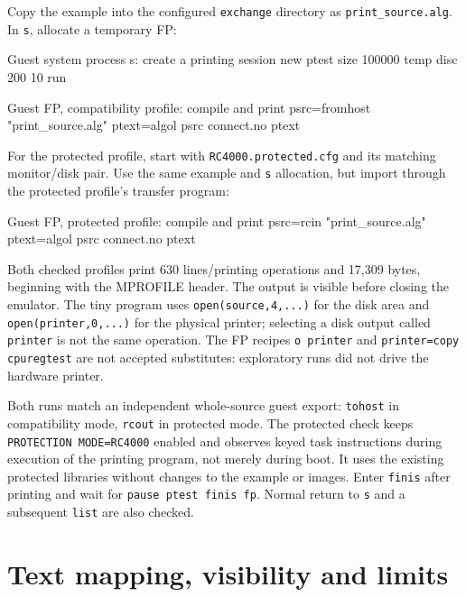 Copy the example into the configured \texttt{exchange} directory as
\texttt{print\_source.alg}. In \texttt{s}, allocate a temporary FP:

\begin{commandexample}{Guest system process s: create a printing session}
new ptest size 100000 temp disc 200 10 run
\end{commandexample}

\begin{commandexample}{Guest FP, compatibility profile: compile and print}
psrc=fromhost "print_source.alg"
ptext=algol psrc connect.no
ptext
\end{commandexample}

For the protected profile, start with \texttt{RC4000.protected.cfg} and its
matching monitor/disk pair. Use the same example and \texttt{s} allocation,
but import through the protected profile's transfer program:

\begin{commandexample}{Guest FP, protected profile: compile and print}
psrc=rcin "print_source.alg"
ptext=algol psrc connect.no
ptext
\end{commandexample}

Both checked profiles print 630 lines/printing operations and 17,309
bytes, beginning with the MPROFILE header. The output is visible before closing
the emulator. The tiny program uses \texttt{open(source,4,...)} for the disk
area and \texttt{open(printer,0,...)} for the physical printer; selecting a
disk output called \texttt{printer} is not the same operation.
The FP recipes \texttt{o printer} and \texttt{printer=copy cpuregtest} are
not accepted substitutes: exploratory runs did not drive the hardware printer.

Both runs match an independent whole-source guest export: \texttt{tohost} in
compatibility mode, \texttt{rcout} in protected mode. The protected check keeps
\texttt{PROTECTION MODE=RC4000} enabled and observes keyed task instructions
during execution of the printing program, not merely during boot. It uses
the existing protected libraries without changes to the example or images.
Enter \texttt{finis} after printing and wait for \texttt{pause ptest finis fp}.
Normal return to \texttt{s} and a subsequent \texttt{list} are also checked.

\section{Text mapping, visibility and limits}

